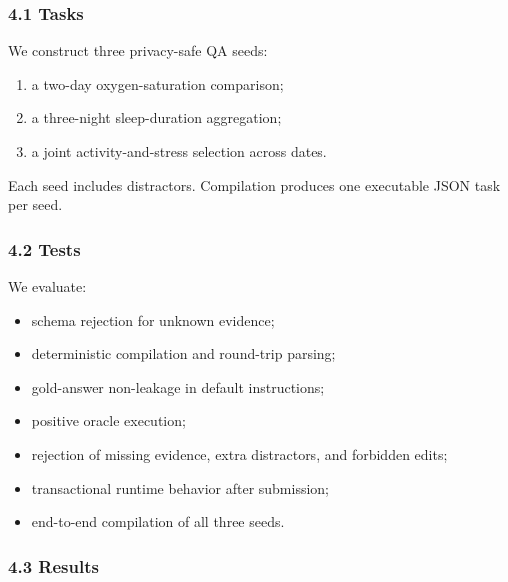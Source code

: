 \documentclass[
]{article}
\providecommand{\tightlist}{%
  \setlength{\itemsep}{0pt}\setlength{\parskip}{0pt}}
\begin{document}
\subsubsection{4.1 Tasks}\label{tasks}

We construct three privacy-safe QA seeds:

\begin{enumerate}
\def\labelenumi{\arabic{enumi}.}
\tightlist
\item
  a two-day oxygen-saturation comparison;
\item
  a three-night sleep-duration aggregation;
\item
  a joint activity-and-stress selection across dates.
\end{enumerate}

Each seed includes distractors. Compilation produces one executable JSON
task per seed.

\subsubsection{4.2 Tests}\label{tests}

We evaluate:

\begin{itemize}
\tightlist
\item
  schema rejection for unknown evidence;
\item
  deterministic compilation and round-trip parsing;
\item
  gold-answer non-leakage in default instructions;
\item
  positive oracle execution;
\item
  rejection of missing evidence, extra distractors, and forbidden edits;
\item
  transactional runtime behavior after submission;
\item
  end-to-end compilation of all three seeds.
\end{itemize}

\subsubsection{4.3 Results}\label{results}
\end{document}
